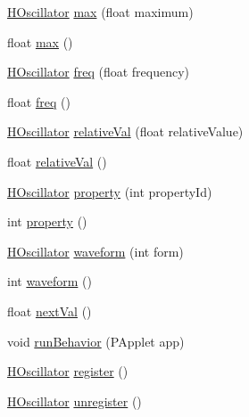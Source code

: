 \begin{DoxyCompactItemize}
\item 
\hyperlink{classhype_1_1behavior_1_1_h_oscillator}{H\-Oscillator} \hyperlink{classhype_1_1behavior_1_1_h_oscillator_a9c45ff2f5c49db383d81df26725bdf2f}{max} (float maximum)
\item 
float \hyperlink{classhype_1_1behavior_1_1_h_oscillator_a36f5b2d8f9f5c95136cfffa12dfe41de}{max} ()
\item 
\hyperlink{classhype_1_1behavior_1_1_h_oscillator}{H\-Oscillator} \hyperlink{classhype_1_1behavior_1_1_h_oscillator_ad8abe470492cb7369de07304f8d991c0}{freq} (float frequency)
\item 
float \hyperlink{classhype_1_1behavior_1_1_h_oscillator_a24327f070bfcca62617366bd117bf11d}{freq} ()
\item 
\hyperlink{classhype_1_1behavior_1_1_h_oscillator}{H\-Oscillator} \hyperlink{classhype_1_1behavior_1_1_h_oscillator_a92cb73055388c317267614fb09a29786}{relative\-Val} (float relative\-Value)
\item 
float \hyperlink{classhype_1_1behavior_1_1_h_oscillator_ace36b4ea82a7cf556430be8443673880}{relative\-Val} ()
\item 
\hyperlink{classhype_1_1behavior_1_1_h_oscillator}{H\-Oscillator} \hyperlink{classhype_1_1behavior_1_1_h_oscillator_a3c0d9ab739619f5b14dc8508711e7148}{property} (int property\-Id)
\item 
int \hyperlink{classhype_1_1behavior_1_1_h_oscillator_a966798f379ac11c21d3190caa4a9571a}{property} ()
\item 
\hyperlink{classhype_1_1behavior_1_1_h_oscillator}{H\-Oscillator} \hyperlink{classhype_1_1behavior_1_1_h_oscillator_a8bff5aa9e36d40ce17c07ea3ea34e9ed}{waveform} (int form)
\item 
int \hyperlink{classhype_1_1behavior_1_1_h_oscillator_ab86521034151a0c585058d590f4cad8b}{waveform} ()
\item 
float \hyperlink{classhype_1_1behavior_1_1_h_oscillator_a46363cacf632209deff97e3bd3f13969}{next\-Val} ()
\item 
void \hyperlink{classhype_1_1behavior_1_1_h_oscillator_acbaecb20d2aec5ffe62b4c3079a7207c}{run\-Behavior} (P\-Applet app)
\item 
\hyperlink{classhype_1_1behavior_1_1_h_oscillator}{H\-Oscillator} \hyperlink{classhype_1_1behavior_1_1_h_oscillator_ac9f533b66ec5de4e06e20808e254c3de}{register} ()
\item 
\hyperlink{classhype_1_1behavior_1_1_h_oscillator}{H\-Oscillator} \hyperlink{classhype_1_1behavior_1_1_h_oscillator_aa76d91f3a0d1c3c3955e0d15bbec7202}{unregister} ()
\end{DoxyCompactItemize}
